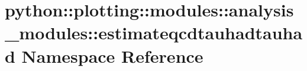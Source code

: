 \hypertarget{namespacepython_1_1plotting_1_1modules_1_1analysis__modules_1_1estimateqcdtauhadtauhad}{
\section{python::plotting::modules::analysis\_\-modules::estimateqcdtauhadtauhad Namespace Reference}
\label{namespacepython_1_1plotting_1_1modules_1_1analysis__modules_1_1estimateqcdtauhadtauhad}
}
